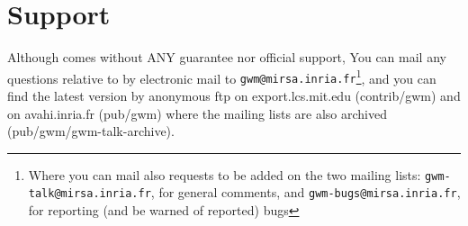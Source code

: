 \section*{Support}

\sloppy Although {\GWM} comes without ANY guarantee nor official support, You can mail any questions relative to {\GWM} by electronic mail to
{\tt gwm@mirsa.inria.fr}\footnote{Where you can mail also requests to be added
on the two mailing lists: {\tt gwm-talk@mirsa.inria.fr}, for general comments,
and {\tt gwm-bugs@mirsa.inria.fr}, for reporting (and be warned of reported)
bugs}, and you can find the latest {\GWM} version by anonymous ftp on
export.lcs.mit.edu (contrib/gwm) and on avahi.inria.fr (pub/gwm) where the
mailing lists are also archived (pub/gwm/gwm-talk-archive).
